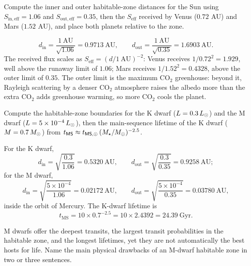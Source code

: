 \parti Compute the inner and outer habitable-zone distances for the Sun using $S_\mathrm{in,eff} = 1.06$ and $S_\mathrm{out,eff} = 0.35$, then the $S_\mathrm{eff}$ received by Venus ($0.72$ AU) and Mars ($1.52$ AU), and place both planets relative to the zone.

\begin{solution}
\[
d_\mathrm{in} = \frac{1\ \mathrm{AU}}{\sqrt{1.06}} = 0.9713\ \mathrm{AU},
\qquad
d_\mathrm{out} = \frac{1\ \mathrm{AU}}{\sqrt{0.35}} = 1.6903\ \mathrm{AU}.
\]
The received flux scales as $S_\mathrm{eff} = (d/1\ \mathrm{AU})^{-2}$:
Venus receives $1/0.72^2 = 1.929$, well above the runaway limit of $1.06$; Mars receives $1/1.52^2 = 0.4328$, above the outer limit of $0.35$.
The outer limit is the maximum $\mathrm{CO_2}$ greenhouse: beyond it, Rayleigh scattering by a denser $\mathrm{CO_2}$ atmosphere raises the albedo more than the extra $\mathrm{CO_2}$ adds greenhouse warming, so more $\mathrm{CO_2}$ cools the planet.
\end{solution}

\parti Compute the habitable-zone boundaries for the K dwarf ($L = 0.3\,L_{\odot}$) and the M dwarf ($L = 5 \times 10^{-4}\,L_{\odot}$), then the main-sequence lifetime of the K dwarf ($M = 0.7\,M_{\odot}$) from $t_\mathsf{MS} \approx t_\mathsf{MS,\odot}\,(M_\star/M_{\odot})^{-2.5}$.

\begin{solution}
For the K dwarf,
\[
d_\mathrm{in} = \sqrt{\frac{0.3}{1.06}} = 0.5320\ \mathrm{AU},
\qquad
d_\mathrm{out} = \sqrt{\frac{0.3}{0.35}} = 0.9258\ \mathrm{AU};
\]
for the M dwarf,
\[
d_\mathrm{in} = \sqrt{\frac{5\times10^{-4}}{1.06}} = 0.02172\ \mathrm{AU},
\qquad
d_\mathrm{out} = \sqrt{\frac{5\times10^{-4}}{0.35}} = 0.03780\ \mathrm{AU},
\]
inside the orbit of Mercury.
The K-dwarf lifetime is
\[
t_\mathrm{MS} = 10 \times 0.7^{-2.5} = 10 \times 2.4392 = 24.39\ \mathrm{Gyr}.
\]
\end{solution}

\parti M dwarfs offer the deepest transits, the largest transit probabilities in the habitable zone, and the longest lifetimes, yet they are not automatically the best hosts for life. Name the main physical drawbacks of an M-dwarf habitable zone in two or three sentences.

